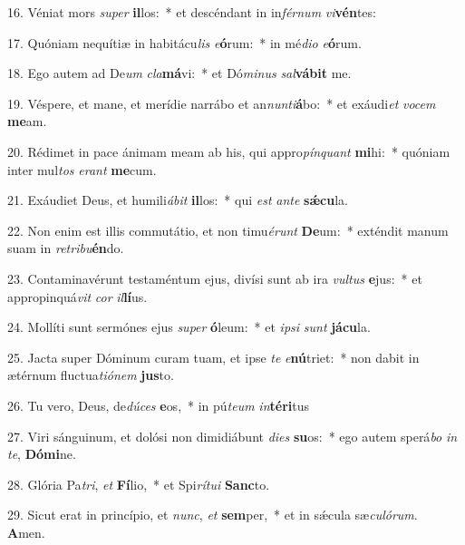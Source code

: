 16. Véniat mors \textit{su}\textit{per} \textbf{il}los:~*  et descéndant in in\textit{fér}\textit{num} \textit{vi}\textbf{vén}tes:\

17. Quóniam nequítiæ in habitácu\textit{lis} \textit{e}\textbf{ó}rum:~*  in mé\textit{di}\textit{o} \textit{e}\textbf{ó}rum.\

18. Ego autem ad De\textit{um} \textit{cla}\textbf{má}vi:~*  et Dó\textit{mi}\textit{nus} \textit{sal}\textbf{vá}\textbf{bit} me.\

19. Véspere, et mane, et merídie narrábo et an\textit{nun}\textit{ti}\textbf{á}bo:~*  et exáudi\textit{et} \textit{vo}\textit{cem} \textbf{me}am.\

20. Rédimet in pace ánimam meam ab his, qui appro\textit{pín}\textit{quant} \textbf{mi}hi:~*  quóniam inter mul\textit{tos} \textit{e}\textit{rant} \textbf{me}cum.\

21. Exáudiet Deus, et humili\textit{á}\textit{bit} \textbf{il}los:~*  qui \textit{est} \textit{an}\textit{te} \textbf{sǽ}\textbf{cu}la.\

22. Non enim est illis commutátio, et non timu\textit{é}\textit{runt} \textbf{De}um:~*  exténdit manum suam in \textit{re}\textit{tri}\textit{bu}\textbf{én}do.\

23. Contaminavérunt testaméntum ejus, divísi sunt ab ira \textit{vul}\textit{tus} \textbf{e}jus:~*  et appropinquá\textit{vit} \textit{cor} \textit{il}\textbf{lí}us.\

24. Mollíti sunt sermónes ejus \textit{su}\textit{per} \textbf{ó}leum:~*  et \textit{ip}\textit{si} \textit{sunt} \textbf{já}\textbf{cu}la.\

25. Jacta super Dóminum curam tuam, et ipse \textit{te} \textit{e}\textbf{nú}triet:~*  non dabit in ætérnum fluctua\textit{ti}\textit{ó}\textit{nem} \textbf{jus}to.\

26. Tu vero, Deus, de\textit{dú}\textit{ces} \textbf{e}os,~*  in pú\textit{te}\textit{um} \textit{in}\textbf{tér}\textbf{i}tus\

27. Viri sánguinum, et dolósi non dimidiábunt \textit{di}\textit{es} \textbf{su}os:~*  ego autem sperá\textit{bo} \textit{in} \textit{te}, \textbf{Dó}\textbf{mi}ne.\

28. Glória Pa\textit{tri}, \textit{et} \textbf{Fí}lio,~*  et Spi\textit{rí}\textit{tu}\textit{i} \textbf{Sanc}to.\

29. Sicut erat in princípio, et \textit{nunc}, \textit{et} \textbf{sem}per,~*  et in sǽcula sæ\textit{cu}\textit{ló}\textit{rum}. \textbf{A}men.\

